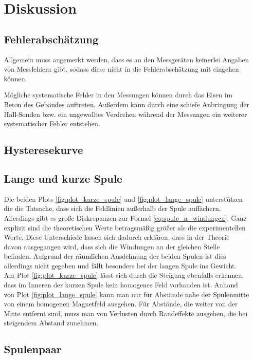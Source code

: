 \section{Diskussion}


\subsection{Fehlerabschätzung}
Allgemein muss angemerkt werden, dass es an den Messgeräten keinerlei Angaben von Messfehlern gibt,
sodass diese nicht in die Fehlerabschätzung mit eingehen können.

\noindent
Mögliche systematische Fehler in den Messungen können durch das Eisen im Beton des Gebäudes auftreten.
Außerdem kann durch eine schiefe Anbringung der Hall-Sonden bzw. ein ungewolltes Verdrehen während der Messungen
ein weiterer systematischer Fehler entstehen. 


\subsection{Hysteresekurve}

\subsection{Lange und kurze Spule}
Die beiden Plots \ref{fig:plot_kurze_spule} und \ref{fig:plot_lange_spule} unterstützen die die Tatsache, 
dass sich die Feldlinien außerhalb der Spule auffächern.
Allerdings gibt es große Diskrepanzen zur Formel \eqref{eq:spule_n_windungen}.
Ganz explizit sind die theoretischen Werte betragsmäßig größer als die experimentellen Werte.
Diese Unterschiede lassen sich dadurch erklären, dass in der Theorie davon ausgegangen wird, dass sich die Windungen an der gleichen Stelle befinden.
Aufgrund der räumlichen Ausdehnung der beiden Spulen ist dies allerdings nicht gegeben und fällt besonders bei der langen Spule ins Gewicht.
Am Plot \ref{fig:plot_kurze_spule} lässt sich durch die Steigung ebenfalls erkennen, dass im Inneren der kurzen Spule kein homogenes Feld vorhanden ist.
Anhand von Plot \ref{fig:plot_lange_spule} kann man nur für Abstände nahe der Spulenmitte von einem homogenen Magnetfeld ausgehen.
Für Abstände, die weiter von der Mitte entfernt sind, muss man von Verlusten durch Randeffekte ausgehen, die bei steigendem Abstand zunehmen.


\subsection{Spulenpaar}


